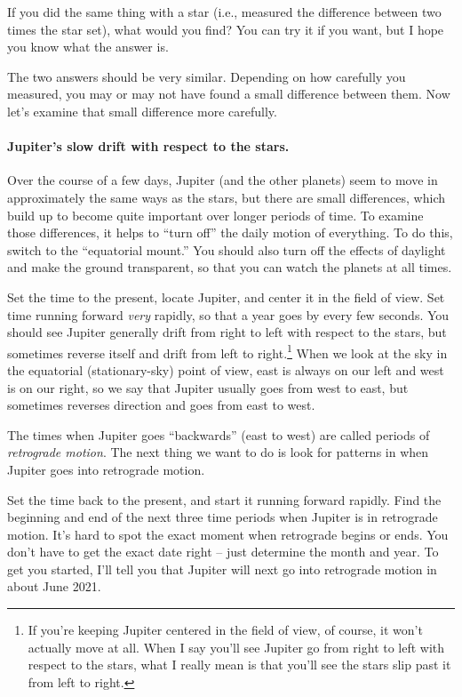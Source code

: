 \vskip 1.5in

If you did the same thing with a star (i.e., measured the difference between
two times  the star set), what would you find? You can try it if you want,
but I hope you know what the answer is.

\vskip 1in

The two answers should be very similar. Depending on how carefully you 
measured, you may or may not have found a small difference between them.
Now let's examine that small difference more carefully.

\paragraph{Jupiter's slow drift with respect to the stars.}
Over the course of a few days, Jupiter (and the other planets) seem to
move in approximately the same ways as the stars, but there are 
small differences, which build up to become quite important
over longer periods of time. To examine those differences,
it helps to ``turn off'' the daily motion of everything.
To do this, switch to the ``equatorial mount.''
You should also turn off the effects of daylight and make the ground
transparent,
so that you can watch the planets at all times.


Set the time to the present, locate Jupiter, and center it in the field
of view. Set time running forward \textit{very} rapidly, so that a year goes by
every few seconds. You should see Jupiter generally drift from right
to left with respect to the stars, but sometimes reverse itself
and drift from left to right.\footnote{If you're keeping Jupiter 
centered in the field of view, of course, it won't actually move at all.
When I say you'll see Jupiter go from right to left
with respect to the stars, what I really mean
is that you'll see the stars slip past it from left to right.}
When we look at the sky in the equatorial (stationary-sky) point of view, 
east is always on
our left and west is on our right, so we say that Jupiter
usually goes from west to east, but sometimes reverses direction and
goes from east to west.

The times when Jupiter goes ``backwards'' (east to west) are called
periods of \textit{retrograde motion}. The next thing we want to 
do is look for patterns in when Jupiter goes into retrograde motion.

Set the time back to the present, and start it running forward
rapidly. Find the beginning and end of the next three time periods
when Jupiter is in retrograde motion. It's hard to spot the
exact moment when retrograde begins or ends. You don't
have to get the exact date right -- just determine the month and
year. To get you started, I'll tell you that Jupiter will
next go into retrograde motion in about June 2021.


